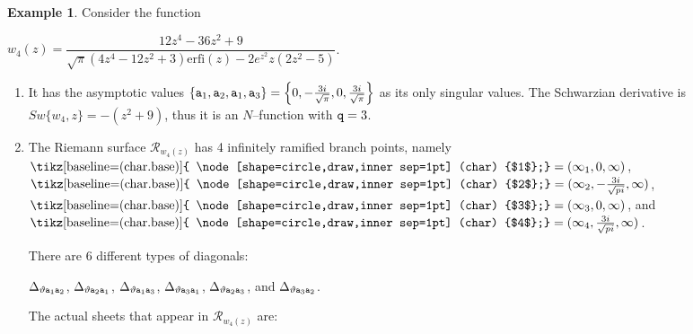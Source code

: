 \documentclass[final,3p,times]{elsarticle}
\newcommand{\R}{\ensuremath{{\mathcal R}}}
\newcommand{\circled}[1]{ \text{\tikz[baseline=(char.base)]{
    \node[shape=circle,draw,inner sep=1pt] (char) {$#1$};}} }
\theoremstyle{definition}
\newtheorem{example}{Example}[section]
\begin{document}
\begin{example}
\label{example:function-wM4alt}
Consider the function

\centerline{
$w_4(z) = \dfrac{12 z^4-36 z^2+9}{\sqrt{\pi } \left(4 z^4-12 z^2+3\right) \text{erfi}(z)-2 e^{z^2} z \left(2 z^2-5\right)}$.
}

\begin{enumerate}[label=\alph*),leftmargin=*]
\item
It has the asymptotic values 
$\{ {\tt a}_1, {\tt a}_2, {\tt a}_1, {\tt a}_3 \} =
\left\{0,-\frac{3 i}{\sqrt{\pi }},0,\frac{3 i}{\sqrt{\pi }}\right\}$ as its only singular values.
The Schwarzian derivative is $Sw\{ w_4, z \} = -(z^2 + 9)$,
thus it is an $N$--function with ${\tt q}=3$.

\item 
The Riemann surface $\R_{w_4(z)}$ has 4 infinitely ramified branch points, namely
$\circled{1}=(\infty_1, 0, \infty)$,
$\circled{2}=(\infty_2, -\frac{3i}{\sqrt{pi}}, \infty)$,
$\circled{3}=(\infty_3, 0, \infty)$, and
$\circled{4}=(\infty_4, \frac{3i}{\sqrt{pi}}, \infty)$.

\noindent
There are 6 different types of diagonals:

\centerline{
$\Delta_{\vartheta {\tt a}_1 {\tt a}_2}$,
$\Delta_{\vartheta {\tt a}_2 {\tt a}_1}$,
$\Delta_{\vartheta {\tt a}_1 {\tt a}_3}$,
$\Delta_{\vartheta {\tt a}_3 {\tt a}_1}$,
$\Delta_{\vartheta {\tt a}_2 {\tt a}_3}$, and
$\Delta_{\vartheta {\tt a}_3 {\tt a}_2}$.
}

\noindent
The actual sheets that appear in $\R_{w_4(z)}$ are:


\end{enumerate}
\end{example}
\end{document}
